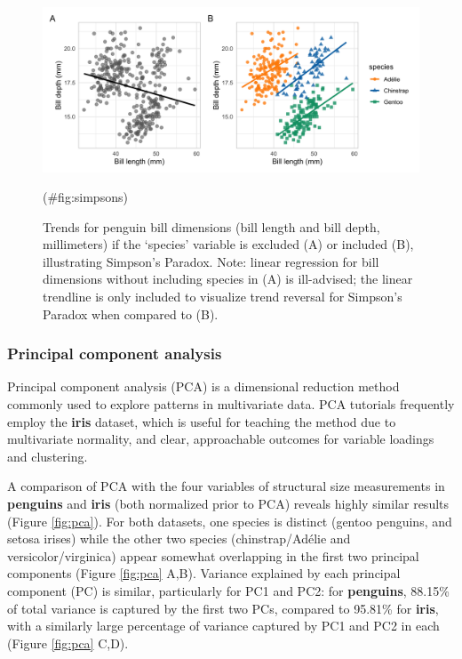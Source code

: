 \begin{Schunk}
\begin{figure}[htbp]

{\centering \includegraphics[width=6in]{fig/simpson_gg} 

}

\caption[Trends for penguin bill dimensions (bill length and bill depth, millimeters) if the ‘species’ variable is excluded (A) or included (B), illustrating Simpson’s Paradox]{Trends for penguin bill dimensions (bill length and bill depth, millimeters) if the ‘species’ variable is excluded (A) or included (B), illustrating Simpson’s Paradox. Note: linear regression for bill dimensions without including species in (A) is ill-advised; the linear trendline is only included to visualize trend reversal for Simpson’s Paradox when compared to (B).}(\#fig:simpsons)
\end{figure}
\end{Schunk}

\hypertarget{principal-component-analysis}{%
\subsubsection{Principal component analysis}\label{principal-component-analysis}}

Principal component analysis (PCA) is a dimensional reduction method commonly used to explore patterns in multivariate data. PCA tutorials frequently employ the \textbf{iris} dataset, which is useful for teaching the method due to multivariate normality, and clear, approachable outcomes for variable loadings and clustering.

A comparison of PCA with the four variables of structural size measurements in \textbf{penguins} and \textbf{iris} (both normalized prior to PCA) reveals highly similar results (Figure \ref{fig:pca}). For both datasets, one species is distinct (gentoo penguins, and setosa irises) while the other two species (chinstrap/Adélie and versicolor/virginica) appear somewhat overlapping in the first two principal components (Figure \ref{fig:pca} A,B). Variance explained by each principal component (PC) is similar, particularly for PC1 and PC2: for \textbf{penguins}, 88.15\% of total variance is captured by the first two PCs, compared to 95.81\% for \textbf{iris}, with a similarly large percentage of variance captured by PC1 and PC2 in each (Figure \ref{fig:pca} C,D).

